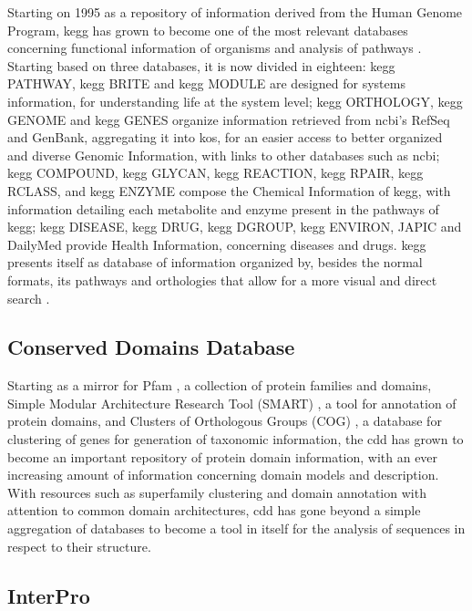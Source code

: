 \documentclass[
  oneside,
  11pt, a4paper,
  footinclude=true,
  headinclude=true,
  cleardoublepage=empty
]{scrbook}
\begin{document}
    Starting on 1995 as a repository of information derived from the Human Genome Program, \gls{kegg} has grown to become one of the most relevant databases concerning functional information of organisms and analysis of pathways \citep{Kanehisa2000a}. Starting based on three databases, it is now divided in eighteen: \gls{kegg} PATHWAY, \gls{kegg} BRITE and \gls{kegg} MODULE are designed for systems information, for understanding life at the system level; \gls{kegg} ORTHOLOGY, \gls{kegg} GENOME and \gls{kegg} GENES organize information retrieved from \gls{ncbi}'s RefSeq and GenBank, aggregating it into \gls{ko}s, for an easier access to better organized and diverse Genomic Information, with links to other databases such as \gls{ncbi}; \gls{kegg} COMPOUND, \gls{kegg} GLYCAN, \gls{kegg} REACTION, \gls{kegg} RPAIR, \gls{kegg} RCLASS, and \gls{kegg} ENZYME compose the Chemical Information of \gls{kegg}, with information detailing each metabolite and enzyme present in the pathways of \gls{kegg}; \gls{kegg} DISEASE, \gls{kegg} DRUG, \gls{kegg} DGROUP, \gls{kegg} ENVIRON, JAPIC and DailyMed provide Health Information, concerning diseases and drugs. \gls{kegg} presents itself as database of information organized by, besides the normal formats, its pathways and orthologies that allow for a more visual and direct search \citep{Kanehisa2000a, Kanehisa2016}.
    
    \subsection{Conserved Domains Database}
    
    Starting as a mirror for Pfam \citep{Bateman2004}, a collection of protein families and domains, Simple Modular Architecture Research Tool (SMART) \citep{Letunic2004}, a tool for annotation of protein domains, and Clusters of Orthologous Groups (COG) \citep{Tatusov2003}, a database for clustering of genes for generation of taxonomic information, the \gls{cdd} has grown to become an important repository of protein domain information, with an ever increasing amount of information concerning domain models and description. With resources such as superfamily clustering and domain annotation with attention to common domain architectures, \gls{cdd} has gone beyond a simple aggregation of databases to become a tool in itself for the analysis of sequences in respect to their structure.
    
    \subsection{InterPro}
    
\end{document}
